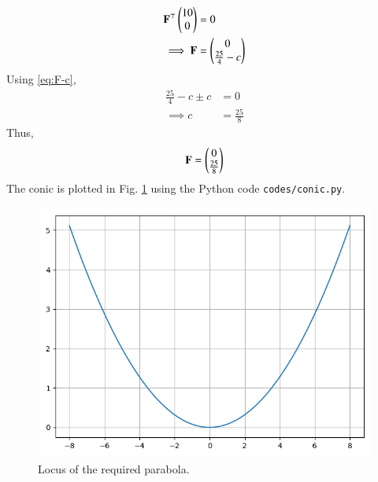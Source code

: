 \documentclass[journal,12pt,twocolumn]{IEEEtran}
\renewcommand{\vec}[1]{\boldsymbol{\mathbf{#1}}}
\begin{document}
\begin{enumerate}
\begin{align}
        \vec{F}^\top\myvec{10\\0} &= 0 \\
        \implies \vec{F} &= \myvec{0\\\frac{25}{4}-c}
    \end{align}
    Using \eqref{eq:F-c},
    \begin{align}
        \frac{25}{4}-c\pm c &= 0 \\
        \implies c &= \frac{25}{8}
    \end{align}
    Thus,
    \begin{align}
        \vec{F} = \myvec{0\\\frac{25}{8}}
    \end{align}
    The conic is plotted in Fig. \ref{fig:conic} using the Python code 
    \texttt{codes/conic.py}.
    \begin{figure}[!ht]
        \centering
        \includegraphics[width=\columnwidth]{figs/conic.png}
        \caption{Locus of the required parabola.}
        \label{fig:conic}
    \end{figure}
\end{enumerate}
\end{document}

